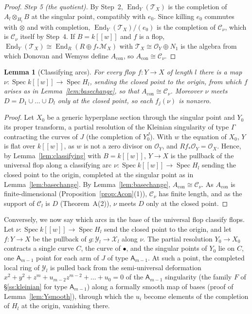 \documentclass[11pt]{amsart}
\makeatletter
\numberwithin{table}{section}
\numberwithin{figure}{section}
\numberwithin{equation}{section}
\newtheorem{lem}[thm]{Lemma}
\theoremstyle{definition}
\theoremstyle{plain}
\newcommand{\Acon}{A_{\mathrm{con}}}
\newcommand{\cC}{\mathcal{C}}
\newcommand{\cO}{\mathcal{O}}
\newcommand{\cX}{\mathcal{X}}
\newcommand{\cY}{\mathcal{Y}}
\newcommand{\bul}{\bullet}
\DeclareMathOperator{\Spec}{Spec}
\DeclareMathOperator{\End}{End}
\renewcommand\paragraph{\@startsection{paragraph}{4}{\z@}{\medskipamount}{-.5em}{\normalfont\bfseries}}
\makeatother
\begin{document}
\begin{proof}
\emph{Step 5 (the quotient).} By Step~2, $\End_Y(\mathcal T_X)$ is the completion of $A_l \otimes_{H_l} B$ at the singular point, compatibly with $e_0$. Since killing $e_0$ commutes with $\otimes$ and with completion, $\End_Y(\mathcal T_X)/(e_0)$ is the completion of $\cC_\nu$, which is $\cC_\nu$ itself by Step~4. If $B = k[[w]]$ and $f$ is a flop, $\End_Y(\mathcal T_X) \cong \End_R(R \oplus f_*\mathcal M_X)$ with $\mathcal T_X \cong \cO_Y \oplus N_1$ is the algebra from which Donovan and Wemyss define $\Acon$, so $\Acon \cong \cC_\nu$.
\end{proof}

\begin{lem}[Classifying arcs]\label{lem:arcs}
For every flop $f\colon Y \to X$ of length $l$ there is a map $\nu\colon \Spec k[[w]] \to \Spec H_l$, sending the closed point to the origin, from which $f$ arises as in Lemma~\ref{lem:basechange}, so that $\Acon \cong \cC_\nu$. Moreover $\nu$ meets $D = D_1 \cup \dots \cup D_l$ only at the closed point, so each $f_j(\nu)$ is nonzero.
\end{lem}

\begin{proof}
Let $X_0$ be a generic hyperplane section through the singular point and $Y_0$ its proper transform, a partial resolution of the Kleinian singularity of type $\Gamma$ contracting the curves of $J$ (the completion of $Y_0^J$). With $w$ the equation of $X_0$, $Y$ is flat over $k[[w]]$, as $w$ is not a zero divisor on $\cO_Y$, and $Rf_*\cO_Y = \cO_X$. Hence, by Lemma~\ref{lem:classifying} with $B = k[[w]]$, $Y \to X$ is the pullback of the universal flop along a classifying arc $\nu\colon \Spec k[[w]] \to \Spec H_l$ sending the closed point to the origin, completed at the singular point as in Lemma~\ref{lem:basechange}. By Lemma~\ref{lem:basechange}, $\Acon \cong \cC_\nu$. As $\Acon$ is finite-dimensional (Proposition~\ref{prop:Acon}(1)), $\cC_\nu$ has finite length, and as the support of $\cC_l$ is $D$ (Theorem~A(2)), $\nu$ meets $D$ only at the closed point.
\end{proof}

\paragraph{Arcs that classify flops.} Conversely, we now say which arcs in the base of the universal flop classify flops. Let $\nu\colon \Spec k[[w]] \to \Spec H_l$ send the closed point to the origin, and let $f\colon Y \to X$ be the pullback of $g\colon \cY_l \to \cX_l$ along $\nu$. The partial resolution $Y_0 \to X_0$ contracts a single curve $C$, the curve of $\bul$, and the singular points of $Y_0$ lie on $C$, one $\mathsf{A}_{m-1}$ point for each arm of $J$ of type $\mathsf{A}_{m-1}$. At such a point, the completed local ring of $\cY_l$ is pulled back from the semi-universal deformation $x^2 + y^2 + z^m + u_{m-2}z^{m-2} + \dots + u_0 = 0$ of the $\mathsf{A}_{m-1}$ singularity (the family $F$ of \S\ref{ss:kleinian} for type $\mathsf{A}_{m-1}$) along a formally smooth map of bases (proof of Lemma~\ref{lem:Ysmooth}), through which the $u_i$ become elements of the completion of $H_l$ at the origin, vanishing there.
\end{document}
